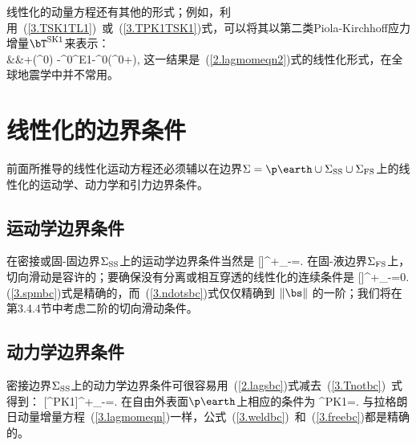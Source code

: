 线性化的动量方程还有其他的形式；例如，利用~(\ref{3.TSK1TL1})~或~(\ref{3.TPK1TSK1})式，可以将其以第二类Piola-Kirchhoff应力增量$\bT^{\rm SK1}$来表示：
\eqa
{} \nonumber \\
&&\mbox{}+\bdel\cdot(\bT^0\cdot\bdel\bs)
-\rho^0\bdel\phi^{\rm E1}-\rho^0\bs\cdot\bdel\bdel(\phi^0+\psi),
\ena
这一结果是~(\ref{2.lagmomeqn2})式的线性化形式，在全球地震学中并不常用。
%
%
%
%

\section{线性化的边界条件}
%
\label{3.sec.bc}

前面所推导的线性化运动方程还必须辅以在边界$\Sigma=\p\earth\cup
\Sigma_{\rm SS}\cup\Sigma_{\rm FS}$上的线性化的运动学、动力学和引力边界条件。

\subsection{运动学边界条件}
%

在密接或固-固边界$\Sigma_{\rm SS}$上的运动学边界条件当然是
\eq
\label{3.spmbc}
[\bs]^+_-=\bzero.
\en
在固-液边界$\Sigma_{\rm FS}$上，切向滑动是容许的；要确保没有分离或相互穿透的线性化的连续条件是
\eq
\label{3.ndotsbc}
[\bnh\cdot\bs]^+_-=0.
\en
(\ref{3.spmbc})式是精确的，而~(\ref{3.ndotsbc})式仅仅精确到 $\|\bs\|$ 的一阶；我们将在第3.4.4节中考虑二阶的切向滑动条件。
%

\subsection{动力学边界条件}
%
\label{3.sec.dynboucon}

密接边界$\Sigma_{\rm SS}$上的动力学边界条件可很容易用~(\ref{2.lagsbc})式减去~(\ref{3.Tnotbc})~式得到：
\eq
\label{3.weldbc}
[\bnh\cdot\bT^{\rm PK1}]^+_-=\bzero.
\en
在自由外表面$\p\earth$上相应的条件为
\eq
\label{3.freebc}
\bnh\cdot\bT^{\rm PK1}=\bzero.
\en
与拉格朗日动量增量方程~(\ref{3.lagmomeqn})一样，公式~(\ref{3.weldbc})~和~(\ref{3.freebc})都是精确的。

